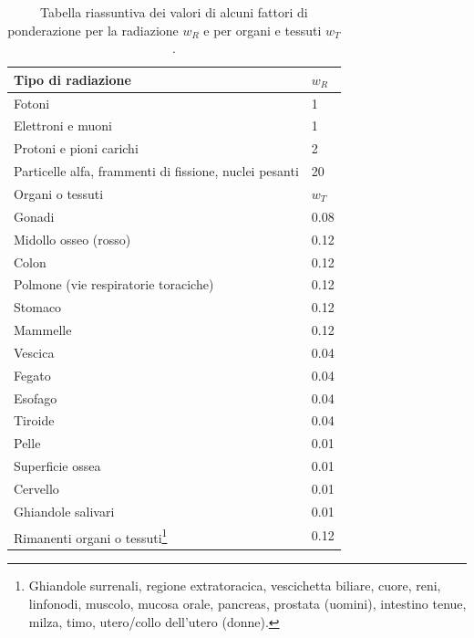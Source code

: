 \documentclass[12pt,a4paper,twoside]{report}
\begin{document}
	\begin{table}[H]
		\begin{minipage}{\textwidth}
			\centering
			\begin{tabular}{ |m{10.5cm}||M{3.3cm}| }
				\hline
				Tipo di radiazione & $w_R$ \\
				\hline\hline
				Fotoni & 1\\
				\hline
				Elettroni e muoni & 1\\
				\hline
				Protoni e pioni carichi & 2\\
				\hline
				Particelle alfa, frammenti di fissione, nuclei pesanti & 20\\
				\hline\hline
				Organi o tessuti & $w_T$\\
				\hline\hline
				Gonadi & 0.08 \\
				\hline
				Midollo osseo (rosso) & 0.12\\
				\hline
				Colon & 0.12\\
				\hline
				Polmone (vie respiratorie toraciche) & 0.12\\
				\hline
				Stomaco & 0.12\\
				\hline
				Mammelle & 0.12\\
				\hline
				Vescica & 0.04\\
				\hline
				Fegato & 0.04\\
				\hline
				Esofago & 0.04\\
				\hline
				Tiroide & 0.04\\
				\hline
				Pelle & 0.01\\
				\hline
				Superficie ossea & 0.01\\
				\hline
				Cervello & 0.01\\
				\hline
				Ghiandole salivari & 0.01\\
				\hline
				Rimanenti organi o tessuti\footnote{Ghiandole surrenali, regione extratoracica, vescichetta biliare, cuore, reni, linfonodi, muscolo, mucosa orale, pancreas, prostata (uomini), intestino tenue, milza, timo, utero/collo dell'utero (donne).} & 0.12\\
				\hline
			\end{tabular}
		\end{minipage}
		\caption{Tabella riassuntiva dei valori di alcuni fattori di ponderazione per la radiazione $w_R$ e per organi e tessuti $w_T$ \cite{dl101_2020}.}
		\label{tab:w_factor}
	\end{table}
	
\end{document}
